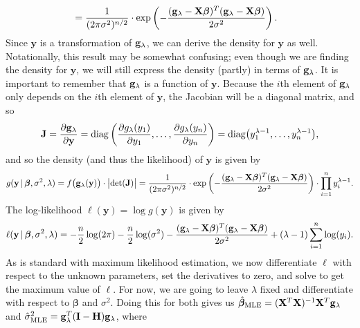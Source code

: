 \documentclass[10pt]{article}
\begin{document}
\begin{itemize}
\begin{align*}
        &= \frac{1}{(2\pi\sigma^2)^{n/2}} \cdot \mathrm{exp} \left( - \frac{(\mathbf{g}_{\lambda} - \mathbf{X}\bm{\beta})^T (\mathbf{g}_{\lambda} - \mathbf{X}\bm{\beta})}{2 \sigma^2} \right).
    \end{align*}
    Since \(\mathbf{y}\) is a transformation of \(\mathbf{g}_{\lambda}\), we can derive the density for \(\mathbf{y}\) as well. Notationally, this result may be somewhat 
    confusing; even though we are finding the density for \(\mathbf{y}\), we will still express the density (partly) in terms of \(\mathbf{g}_{\lambda}\). It is important
    to remember that \(\mathbf{g}_{\lambda}\) is a function of \(\mathbf{y}\). Because the \(i\)th element of \(\mathbf{g}_{\lambda}\) only depends on the \(i\)th element of \(\mathbf{y}\), the Jacobian
    will be a diagonal matrix, and so 
    \begin{align*}
        \mathbf{J}
        = \frac{\partial \mathbf{g}_{\lambda}}{\partial \mathbf{y}}
        = \mathrm{diag} \left( \frac{\partial g_{\lambda}(y_1)}{\partial y_1}, \ldots, \frac{\partial g_{\lambda}(y_n)}{\partial y_n} \right)
        = \mathrm{diag} \big( y_1^{\lambda - 1}, \ldots, y_n^{\lambda - 1} \big), 
    \end{align*}
    and so the density (and thus the likelihood) of \(\mathbf{y}\) is given by 
    \begin{align*}
        g(\mathbf{y} \,|\, \bm{\beta}, \sigma^2, \lambda)
        = f \big( \mathbf{g}_{\lambda}(\mathbf{y}) \big) \cdot \big|\mathrm{det}(\mathbf{J})\big|
        = \frac{1}{(2\pi\sigma^2)^{n/2}} \cdot \mathrm{exp} \left( - \frac{(\mathbf{g}_{\lambda} - \mathbf{X}\bm{\beta})^T (\mathbf{g}_{\lambda} - \mathbf{X}\bm{\beta})}{2 \sigma^2} \right) \cdot \prod_{i=1}^n y_i^{\lambda - 1}.
    \end{align*}
    The log-likelihood \(\ell(\mathbf{y}) = \log g(\mathbf{y})\) is given by 
    \begin{align*}
        \ell(\mathbf{y} \,|\, \bm{\beta}, \sigma^2, \lambda) 
        = - \frac{n}{2} \log (2\pi) - \frac{n}{2} \log (\sigma^2) - \frac{(\mathbf{g}_{\lambda} - \mathbf{X}\bm{\beta})^T (\mathbf{g}_{\lambda} - \mathbf{X}\bm{\beta})}{2 \sigma^2} + (\lambda - 1) \sum_{i=1}^n \log (y_i).
    \end{align*}
    As is standard with maximum likelihood estimation, we now differentiate \(\ell\) with respect to the unknown parameters, set the derivatives to zero, and solve to get the maximum value of \(\ell\). 
    For now, we are going to leave \(\lambda\) fixed and differentiate with respect to \(\bm{\beta}\) and \(\sigma^2\). Doing this for both gives us 
    \(\hat{\bm{\beta}}_{\mathrm{MLE}} = (\mathbf{X}^T\mathbf{X})^{-1}\mathbf{X}^T\mathbf{g}_{\lambda}\) and \(\hat{\sigma}^2_{\mathrm{MLE}} = \mathbf{g}_{\lambda}^T (\mathbf{I} - \mathbf{H}) \mathbf{g}_{\lambda}\), where 

\end{itemize}
\end{document}
